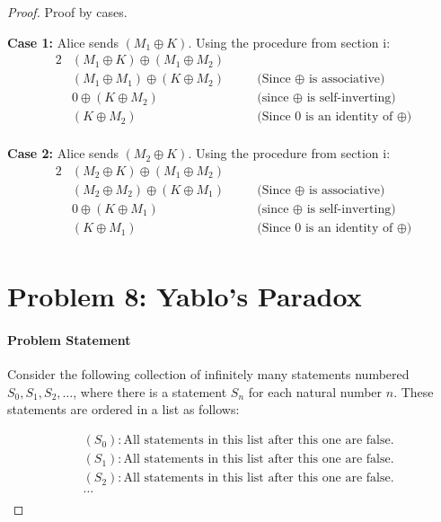\documentclass[10pt,letter]{article}
\begin{document}
\begin{proof}
Proof by cases.

\textbf{Case 1:} Alice sends $(M_1 \oplus K)$. Using the procedure from section i:
\begin{alignat*}{2}
  &(M_1 \oplus K) \oplus (M_1 \oplus M_2) \\
  &(M_1 \oplus M_1) \oplus (K \oplus M_2) &\quad &\text{(Since $\oplus$ is associative)}\\
  &0 \oplus (K \oplus M_2) &\quad &\text{(since $\oplus$ is self-inverting)}\\  
  &(K \oplus M_2) &\quad &\text{(Since 0 is an identity of $\oplus$)}\\
\end{alignat*}

\textbf{Case 2:} Alice sends $(M_2 \oplus K)$. Using the procedure from section i:
\begin{alignat*}{2}
  &(M_2 \oplus K) \oplus (M_1 \oplus M_2) \\
  &(M_2 \oplus M_2) \oplus (K \oplus M_1) &\quad &\text{(Since $\oplus$ is associative)}\\
  &0 \oplus (K \oplus M_1) &\quad &\text{(since $\oplus$ is self-inverting)}\\  
  &(K \oplus M_1) &\quad &\text{(Since 0 is an identity of $\oplus$)}\\
\end{alignat*}

\section*{Problem 8: Yablo's Paradox}
\paragraph{Problem Statement}
Consider the following collection of infinitely many statements numbered $S_0, S_1, S_2, \ldots$, where there is a statement $S_n$ for each natural number $n$. These statements are ordered in a list as follows:

\begin{align*}
&(S_0): \text{All statements in this list after this one are false.}\\
&(S_1): \text{All statements in this list after this one are false.}\\
&(S_2): \text{All statements in this list after this one are false.}\\
&\ldots\\
\end{align*}


\end{proof}
\end{document}

